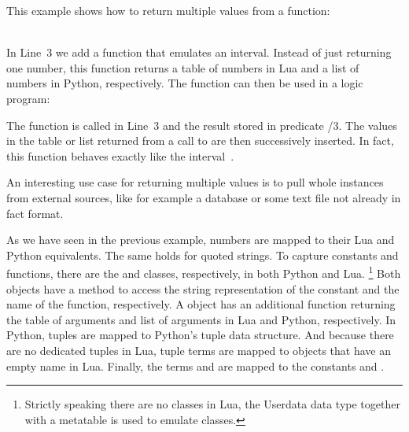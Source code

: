 \begin{example}
This example shows how to return multiple values from a function:
\\[-8pt] %
\begin{minipage}[t]{0.53\textwidth}

\end{minipage}
\begin{minipage}[t]{0.49\textwidth}

\end{minipage}\\
In Line~3 we add a function that emulates an interval.
Instead of just returning one number,
this function returns a table of numbers in Lua and a list of numbers in Python, respectively.
The  function can then be used in a logic program:

%
%
The function is called in Line~3 and the result stored in predicate /$3$.
The values in the table or list returned from a call to  are then successively inserted.
In fact, this function behaves exactly like the interval~.

An interesting use case for returning multiple values is to pull whole
instances from external sources, like for example a database or some text file not already in fact format.
\eexample
\end{example}

As we have seen in the previous example,
numbers are mapped to their Lua and Python equivalents.
The same holds for quoted strings.
To capture constants and functions,
there are the  and  classes, respectively, in both Python and Lua.%
\footnote{Strictly speaking there are no classes in Lua, the Userdata data type together with a metatable is used to emulate classes.}
Both objects have a  method to access the string representation of the constant and the name of the function, respectively.
A  object has an additional function  returning the table of arguments and list of arguments in Lua and Python, respectively.
In Python, tuples are mapped to Python's tuple data structure.
And because there are no dedicated tuples in Lua, tuple terms are mapped to  objects
that have an empty name in Lua.
Finally, the terms  and  are mapped to the constants  and .

